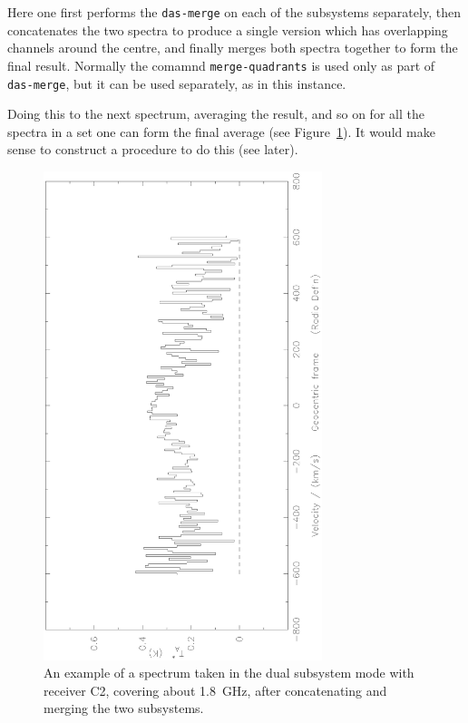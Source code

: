 \documentclass[11pt,twoside]{article}
\begin{document}
Here one first performs the {\tt das-merge} on each of the subsystems
separately, then concatenates the two spectra to produce a single
version which has overlapping channels around the centre, and finally
merges both spectra together to form the final result. Normally the
comamnd {\tt merge-quadrants} is used only as part of {\tt das-merge},
but it can be used separately, as in this instance.

Doing this to the next spectrum, averaging the result, and so on for
all the spectra in a set one can form the final average (see
Figure~\ref{fig:concatenation}). It would make sense to construct a
procedure to do this (see later).

\begin{figure}[htb]
\centering
\includegraphics[angle=-90,width=3.2in]{sc8_concat.ps}
\vspace*{-0.5cm}
\begin{center}
\begin{minipage}[t]{5in}
\caption[Extreme wideband spectra (concatenation)]
{\small{An example of a spectrum taken in the dual subsystem mode with
receiver C2, covering about 1.8~GHz, after concatenating and merging 
the two subsystems.
 }}
\label{fig:concatenation}
\end{minipage}
\end{center}
\end{figure}
\end{document}
